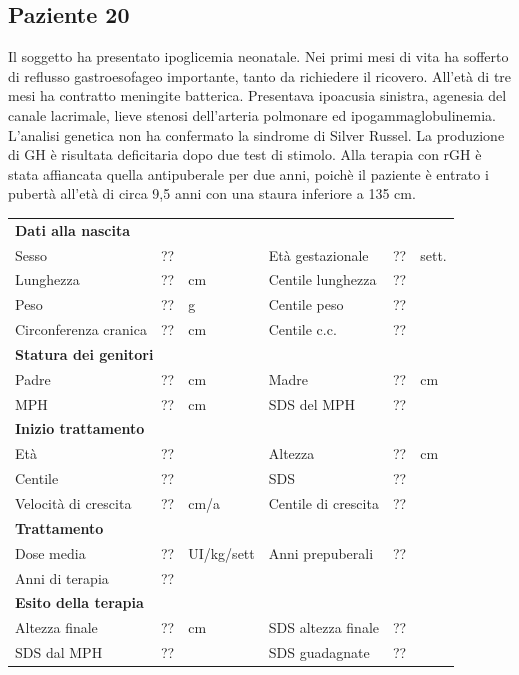 \subsection*{Paziente 20}%

Il soggetto ha presentato ipoglicemia neonatale. Nei primi mesi di vita ha sofferto di reflusso gastroesofageo importante, tanto da richiedere il ricovero. All'età di tre mesi ha contratto meningite batterica. Presentava ipoacusia sinistra, agenesia del canale lacrimale, lieve stenosi dell'arteria polmonare ed ipogammaglobulinemia. L'analisi genetica non ha confermato la sindrome di Silver Russel. La produzione di GH è risultata deficitaria dopo due test di stimolo. Alla terapia con rGH è stata affiancata quella antipuberale per due anni, poichè il paziente è entrato i pubertà all'età di circa 9,5 anni con una staura inferiore a 135 cm.  

\begin{table}[!h]
\begin{tabular}{lrllrl}
\toprule
\multicolumn{6}{l}{\textbf{Dati alla nascita}}\\
Sesso 		& \multicolumn{2}{l}{??} 	& Età gestazionale 		& ?? 		& sett.\\
Lunghezza 	& ?? 		& cm 				& Centile lunghezza		& ?? 		\\
Peso 		& ?? 		& g					& Centile peso			& ?? 		\\
Circonferenza cranica	& ?? 		& cm 	& Centile c.c.			& ?? \\
\midrule
\multicolumn{6}{l}{\textbf{Statura dei genitori}}\\
Padre 		& ?? & cm 	& Madre 				& ?? & cm \\
MPH 		& ?? & cm 	& SDS del MPH 			& ??\\
\midrule
\multicolumn{6}{l}{\textbf{Inizio trattamento}} \\
Età	& ?? & 		& Altezza 				& ?? & cm  \\
Centile & ?? 	 &		& SDS		& ?? \\
Velocità di crescita & ?? & cm/a	& Centile di crescita & ??\\
\midrule
\multicolumn{6}{l}{\textbf{Trattamento}} \\
Dose media		& ?? & UI/kg/sett & Anni prepuberali & ??\\
Anni di terapia & ??\\
\midrule
\multicolumn{6}{l}{\textbf{Esito della terapia}} \\
Altezza finale			& ?? & cm 	& SDS altezza finale		& ??\\
SDS dal MPH				& ?? &		& SDS guadagnate 			& ??\\
\bottomrule
\end{tabular}
\end{table}
\clearpage


